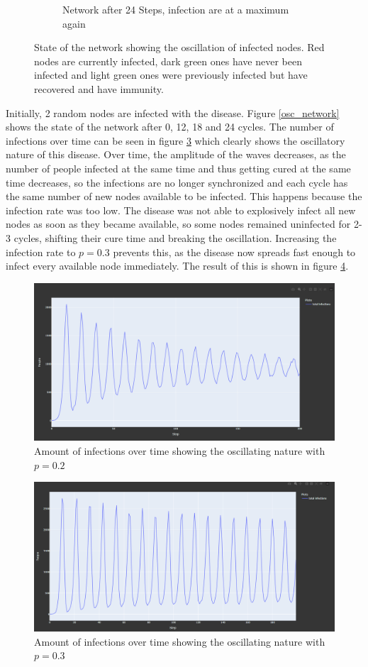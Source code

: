 \begin{figure}
\begin{subfigure}[b]{0.475\textwidth}
        \caption[]%
        {{\small Network after 24 Steps, infection are at a maximum again}}    
        \label{fig:mean and std of net44}
    \end{subfigure}
    \caption[ State of the network showing the oscillation of infected nodes ]
    {\small State of the network showing the oscillation of infected nodes. Red nodes are currently infected, dark green ones have never been infected and 
    light green ones were previously infected but have recovered and have immunity.} 
    \label{fig:osc_network}
\end{figure}

Initially, 2 random nodes are infected with the disease. Figure \ref{osc_network}
shows the state of the network after 0, 12, 18 and 24 cycles.
The number of infections over time can be seen in figure \ref{fig:oscillation_p02}
which clearly shows the oscillatory nature of this disease. Over time, the amplitude of the
waves decreases, as the number of people infected at the same time and thus getting cured
at the same time decreases, so the infections are no longer synchronized and each cycle has the same number of new nodes available to be infected. This happens because the
infection rate was too low. The disease was not able to explosively infect all new nodes
as soon as they became available, so some nodes remained uninfected for 2-3 cycles,
shifting their cure time and breaking the oscillation. Increasing the infection rate
to $p = 0.3$ prevents this, as the disease now spreads fast enough to infect every
available node immediately. The result of this is shown in figure \ref{fig:oscillation_p03}.

\begin{figure}
    \centering
    \includegraphics[width=0.5\linewidth]{images/oscillation_infections.png}
    \caption{Amount of infections over time showing the oscillating nature with $p = 0.2$}
    \label{fig:oscillation_p02}
\end{figure}

\begin{figure}
    \centering
    \includegraphics[width=0.5\linewidth]{images/oscillation_infections3.png}
    \caption{Amount of infections over time showing the oscillating nature with $p = 0.3$}
    \label{fig:oscillation_p03}
\end{figure}

